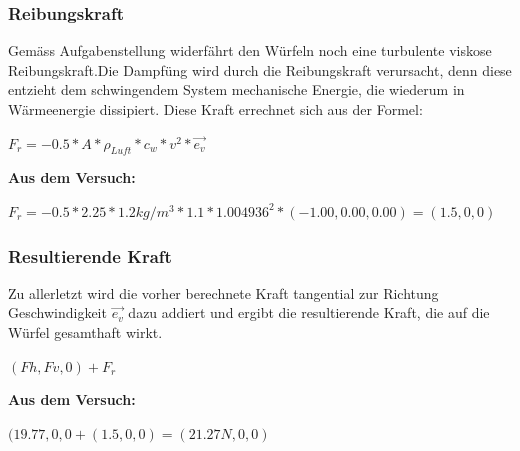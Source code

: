 \documentclass[../main.tex]{subfiles}
\begin{document}
\subsubsection{Reibungskraft}
Gemäss Aufgabenstellung widerfährt den Würfeln noch eine turbulente viskose Reibungskraft.Die Dampfüng wird durch die Reibungskraft verursacht, denn diese entzieht dem schwingendem System mechanische Energie, die wiederum in Wärmeenergie dissipiert. Diese Kraft errechnet sich aus der Formel:
\begin{mdframed}
$F_r = -0.5 * A*\rho_{Luft}*c_w*v^2*\vec{e_v}$
\end{mdframed}
\textbf {Aus dem Versuch:}
\begin{mdframed}
$F_r = -0.5 * 2.25*1.2kg/m^3*1.1*1.004936^2*(-1.00, 0.00, 0.00) = (1.5,0,0)$
\end{mdframed}
\subsubsection{Resultierende Kraft}
Zu allerletzt wird die vorher berechnete Kraft tangential zur Richtung Geschwindigkeit $\vec{e_v}$ dazu addiert und ergibt die resultierende Kraft, die auf die Würfel gesamthaft wirkt. 
\begin{mdframed}
$(Fh,Fv,0) + F_r$
\end{mdframed}	
\textbf {Aus dem Versuch:}
\begin{mdframed}
$(19.77,0,0 + (1.5,0,0) = (21.27N,0,0)$
\end{mdframed}
\end{document}
